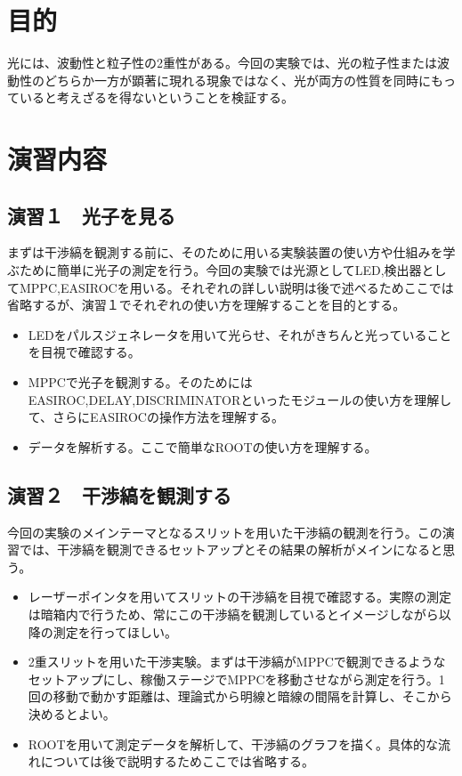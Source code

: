 \documentclass[10pt]{ujarticle}
\begin{document}
\tableofcontents
\clearpage

\section{目的}
光には、波動性と粒子性の2重性がある。今回の実験では、光の粒子性または波動性のどちらか一方が顕著に現れる現象ではなく、光が両方の性質を同時にもっていると考えざるを得ないということを検証する。

\section{演習内容}

\subsection{演習１　光子を見る}
まずは干渉縞を観測する前に、そのために用いる実験装置の使い方や仕組みを学ぶために簡単に光子の測定を行う。今回の実験では光源としてLED,検出器としてMPPC,EASIROCを用いる。それぞれの詳しい説明は後で述べるためここでは省略するが、演習１でそれぞれの使い方を理解することを目的とする。
\begin{itemize}
\item LEDをパルスジェネレータを用いて光らせ、それがきちんと光っていることを目視で確認する。
\item MPPCで光子を観測する。そのためにはEASIROC,DELAY,DISCRIMINATORといったモジュールの使い方を理解して、さらにEASIROCの操作方法を理解する。
\item データを解析する。ここで簡単なROOTの使い方を理解する。
\end{itemize}

\subsection{演習２　干渉縞を観測する}
今回の実験のメインテーマとなるスリットを用いた干渉縞の観測を行う。この演習では、干渉縞を観測できるセットアップとその結果の解析がメインになると思う。
\begin{itemize}
\item レーザーポインタを用いてスリットの干渉縞を目視で確認する。実際の測定は暗箱内で行うため、常にこの干渉縞を観測しているとイメージしながら以降の測定を行ってほしい。
\item 2重スリットを用いた干渉実験。まずは干渉縞がMPPCで観測できるようなセットアップにし、稼働ステージでMPPCを移動させながら測定を行う。1回の移動で動かす距離は、理論式から明線と暗線の間隔を計算し、そこから決めるとよい。
\item ROOTを用いて測定データを解析して、干渉縞のグラフを描く。具体的な流れについては後で説明するためここでは省略する。　
\end{itemize}
\end{document}
